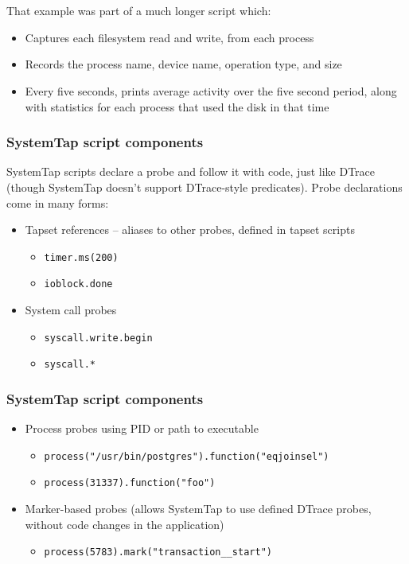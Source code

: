 \documentclass{beamer}
\begin{document}
\begin{frame}
    \frametitle{~}
     That example was part of a much longer script which:
     \begin{itemize}
         \item Captures each filesystem read and write, from each process
         \item Records the process name, device name, operation type, and size
         \item Every five seconds, prints average activity over the five second period, along with statistics for each process that used the disk in that time
     \end{itemize}
\end{frame}

\begin{frame}
     \frametitle{SystemTap script components}
     SystemTap scripts declare a probe and follow it with code, just like DTrace (though SystemTap doesn't support DTrace-style predicates). Probe declarations come in many forms:
     \begin{itemize}
         \item Tapset references -- aliases to other probes, defined in tapset scripts
         \begin{itemize}
             \item \texttt{timer.ms(200)}
             \item \texttt{ioblock.done}
         \end{itemize}
         \item System call probes
         \begin{itemize}
             \item \texttt{syscall.write.begin}
             \item \texttt{syscall.*}
         \end{itemize}
     \end{itemize}
\end{frame}

\begin{frame}
     \frametitle{SystemTap script components}
     \begin{itemize}
         \item Process probes using PID or path to executable
         \begin{itemize}
             \item \texttt{process("/usr/bin/postgres").function("eqjoinsel")}
             \item \texttt{process(31337).function("foo")}
         \end{itemize}
         \item Marker-based probes (allows SystemTap to use defined DTrace probes, without code changes in the application)
         \begin{itemize}
             \item \texttt{process(5783).mark("transaction\_\_start")}
         \end{itemize}
     \end{itemize}
\end{frame}
\end{document}
